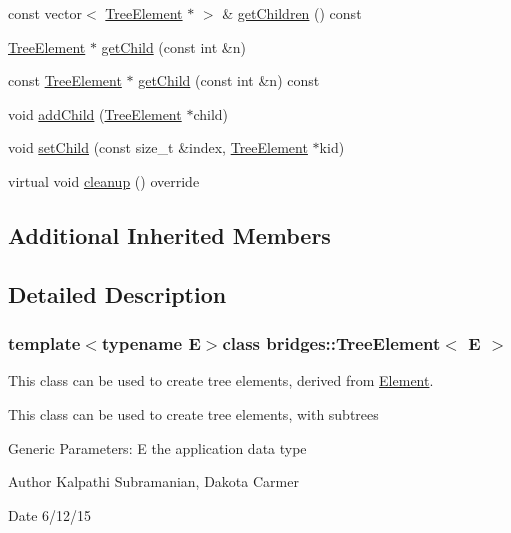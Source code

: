 \begin{DoxyCompactItemize}
\item 
const vector$<$ \hyperlink{classbridges_1_1_tree_element}{Tree\+Element} $\ast$ $>$ \& \hyperlink{classbridges_1_1_tree_element_af3d737b2b29a95e5fb654b46bd74206e}{get\+Children} () const 
\item 
\hyperlink{classbridges_1_1_tree_element}{Tree\+Element} $\ast$ \hyperlink{classbridges_1_1_tree_element_a14ce2d5b3a4df29c93a0c37dbe73f7a5}{get\+Child} (const int \&n)
\item 
const \hyperlink{classbridges_1_1_tree_element}{Tree\+Element} $\ast$ \hyperlink{classbridges_1_1_tree_element_a26c8fb95c8c10ded320f81c64ac0e874}{get\+Child} (const int \&n) const 
\item 
void \hyperlink{classbridges_1_1_tree_element_a5e252fa16df0e673526ba4b08c8d3203}{add\+Child} (\hyperlink{classbridges_1_1_tree_element}{Tree\+Element} $\ast$child)
\item 
void \hyperlink{classbridges_1_1_tree_element_aa12cb7cb4b4f559bdf0967872b0a6e7d}{set\+Child} (const size\+\_\+t \&index, \hyperlink{classbridges_1_1_tree_element}{Tree\+Element} $\ast$kid)
\item 
virtual void \hyperlink{classbridges_1_1_tree_element_aad832c9f8dfd7e92c7b06a825f406e1d}{cleanup} () override
\end{DoxyCompactItemize}
\subsection*{Additional Inherited Members}


\subsection{Detailed Description}
\subsubsection*{template$<$typename E$>$class bridges\+::\+Tree\+Element$<$ E $>$}

This class can be used to create tree elements, derived from \hyperlink{classbridges_1_1_element}{Element}. 

This class can be used to create tree elements, with subtrees

Generic Parameters\+: E the application data type

\begin{DoxyAuthor}{Author}
Kalpathi Subramanian, Dakota Carmer 
\end{DoxyAuthor}
\begin{DoxyDate}{Date}
6/12/15 
\end{DoxyDate}


